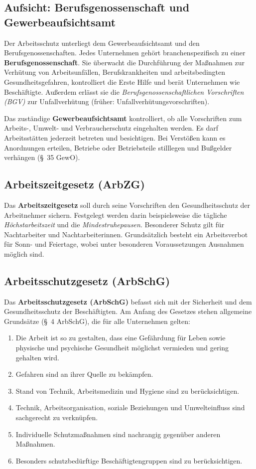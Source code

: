 \documentclass[11pt, a4paper]{article}
\begin{document}
\subsection{Aufsicht: Berufsgenossenschaft und Gewerbeaufsichtsamt}

Der Arbeitsschutz unterliegt dem Gewerbeaufsichtsamt und den Berufsgenossenschaften.
Jedes Unternehmen gehört branchenspezifisch zu einer \textbf{Berufsgenossenschaft}. Sie
überwacht die Durchführung der Maßnahmen zur Verhütung von Arbeitsunfällen,
Berufskrankheiten und arbeitsbedingten Gesundheitsgefahren, kontrolliert die Erste Hilfe
und berät Unternehmen wie Beschäftigte. Außerdem erlässt sie die \emph{Berufsgenossen\-schaftlichen
Vorschriften (BGV)} zur Unfallverhütung (früher: Unfallverhütungsvorschriften).

Das zuständige \textbf{Gewerbeaufsichtsamt} kontrolliert, ob alle Vorschriften zum
Arbeits-, Umwelt- und Verbraucherschutz eingehalten werden. Es darf Arbeitsstätten
jederzeit betreten und besichtigen. Bei Verstößen kann es Anordnungen erteilen, Betriebe
oder Betriebsteile stilllegen und Bußgelder verhängen (\S~35 GewO).

\subsection{Arbeitszeitgesetz (ArbZG)}

Das \textbf{Arbeitszeitgesetz} soll durch seine Vorschriften den Gesundheitsschutz der
Arbeitnehmer sichern. Festgelegt werden darin beispielsweise die tägliche
\emph{Höchstarbeitszeit} und die \emph{Mindestruhepausen}. Besonderer Schutz gilt für
Nachtarbeiter und Nachtarbeiterinnen. Grundsätzlich besteht ein Arbeitsverbot für Sonn-
und Feiertage, wobei unter besonderen Voraussetzungen Ausnahmen möglich sind.

\subsection{Arbeitsschutzgesetz (ArbSchG)}

Das \textbf{Arbeitsschutzgesetz (ArbSchG)} befasst sich mit der Sicherheit und dem
Gesundheitsschutz der Beschäftigten. Am Anfang des Gesetzes stehen allgemeine Grundsätze
(\S~4 ArbSchG), die für alle Unternehmen gelten:

\begin{enumerate}
  \item Die Arbeit ist so zu gestalten, dass eine Gefährdung für Leben sowie physische und psychische Gesundheit möglichst vermieden und gering gehalten wird.
  \item Gefahren sind an ihrer Quelle zu bekämpfen.
  \item Stand von Technik, Arbeitsmedizin und Hygiene sind zu berücksichtigen.
  \item Technik, Arbeitsorganisation, soziale Beziehungen und Umwelteinfluss sind sachgerecht zu verknüpfen.
  \item Individuelle Schutzmaßnahmen sind nachrangig gegenüber anderen Maßnahmen.
  \item Besonders schutzbedürftige Beschäftigtengruppen sind zu berücksichtigen.
\end{enumerate}
\end{document}
